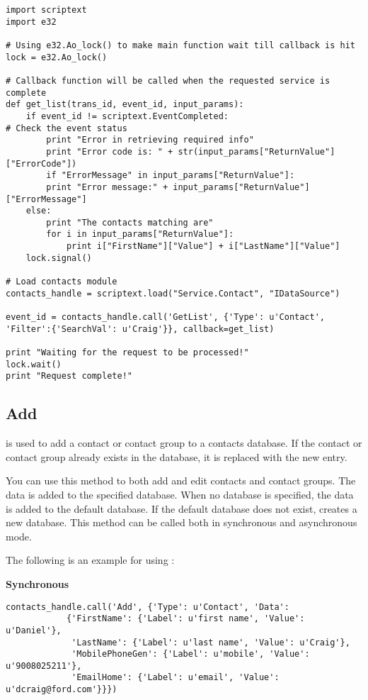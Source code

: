 \begin{verbatim}
import scriptext
import e32

# Using e32.Ao_lock() to make main function wait till callback is hit
lock = e32.Ao_lock()

# Callback function will be called when the requested service is complete
def get_list(trans_id, event_id, input_params):
    if event_id != scriptext.EventCompleted:   
# Check the event status
        print "Error in retrieving required info"
        print "Error code is: " + str(input_params["ReturnValue"]["ErrorCode"])
        if "ErrorMessage" in input_params["ReturnValue"]:
        print "Error message:" + input_params["ReturnValue"]["ErrorMessage"]
    else:
        print "The contacts matching are"
        for i in input_params["ReturnValue"]:
            print i["FirstName"]["Value"] + i["LastName"]["Value"]
    lock.signal()

# Load contacts module
contacts_handle = scriptext.load("Service.Contact", "IDataSource")

event_id = contacts_handle.call('GetList', {'Type': u'Contact', 'Filter':{'SearchVal': u'Craig'}}, callback=get_list)

print "Waiting for the request to be processed!"
lock.wait()
print "Request complete!"
\end{verbatim}

\subsection{Add}
\label{subsec:contactadd}

 is used to add a contact or contact group to a contacts database. If the contact or contact group already exists in the database, it is replaced with the new entry. \break

You can use this method to both add and edit contacts and contact groups. The data is added to the specified database. When no database is specified, the data is added to the default database. If the default database does not exist,  creates a new database. This method can be called both in synchronous and asynchronous mode.

The following is an example for using :

{\bf Synchronous}

\begin{verbatim}
contacts_handle.call('Add', {'Type': u'Contact', 'Data':
            {'FirstName': {'Label': u'first name', 'Value': u'Daniel'},
             'LastName': {'Label': u'last name', 'Value': u'Craig'},
             'MobilePhoneGen': {'Label': u'mobile', 'Value': u'9008025211'},
             'EmailHome': {'Label': u'email', 'Value': u'dcraig@ford.com'}}})
\end{verbatim}

